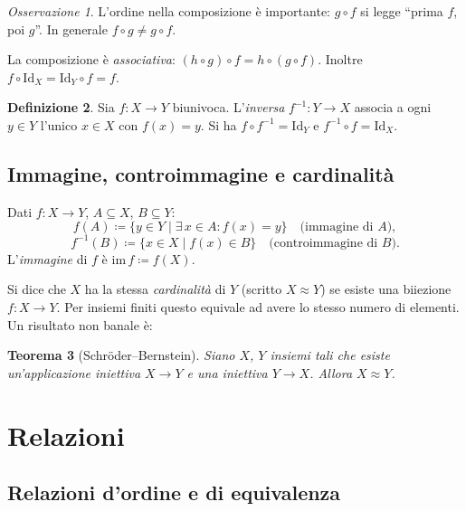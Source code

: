 \documentclass[11pt, a4paper]{book}
\theoremstyle{definition}
\newtheorem{definizione}{Definizione}[section]
\theoremstyle{plain}
\newtheorem{teorema}[definizione]{Teorema}
\theoremstyle{remark}
\newtheorem{osservazione}[definizione]{Osservazione}
\newcommand{\im}{\mathrm{im}\,}
\newcommand{\Id}{\mathrm{Id}}
\begin{document}
\begin{osservazione}
L'ordine nella composizione è importante: $g \circ f$ si legge ``prima $f$, poi $g$''. In generale $f \circ g \neq g \circ f$.
\end{osservazione}

La composizione è \emph{associativa}: $(h \circ g) \circ f = h \circ (g \circ f)$. Inoltre $f \circ \Id_X = \Id_Y \circ f = f$.

\begin{defbox}
\begin{definizione}
Sia $f \colon X \to Y$ biunivoca. L'\emph{inversa} $f^{-1} \colon Y \to X$ associa a ogni $y \in Y$ l'unico $x \in X$ con $f(x) = y$. Si ha $f \circ f^{-1} = \Id_Y$ e $f^{-1} \circ f = \Id_X$.
\end{definizione}
\end{defbox}

\subsection{Immagine, controimmagine e cardinalità}

Dati $f \colon X \to Y$, $A \subseteq X$, $B \subseteq Y$:
\[
  f(A) \coloneqq \{y \in Y \mid \exists\, x \in A : f(x) = y\} \quad \text{(immagine di } A\text{)},
\]
\[
  f^{-1}(B) \coloneqq \{x \in X \mid f(x) \in B\} \quad \text{(controimmagine di } B\text{)}.
\]
L'\emph{immagine} di $f$ è $\im f \coloneqq f(X)$.

\medskip
Si dice che $X$ ha la stessa \emph{cardinalità} di $Y$ (scritto $X \approx Y$) se esiste una biiezione $f \colon X \to Y$. Per insiemi finiti questo equivale ad avere lo stesso numero di elementi. Un risultato non banale è:

\begin{teorema}[Schröder--Bernstein]
Siano $X$, $Y$ insiemi tali che esiste un'applicazione iniettiva $X \to Y$ e una iniettiva $Y \to X$. Allora $X \approx Y$.
\end{teorema}

\section{Relazioni}

\subsection{Relazioni d'ordine e di equivalenza}
\end{document}
